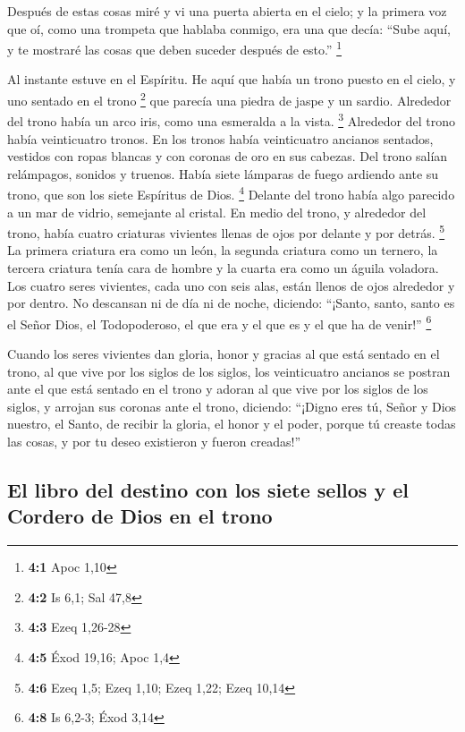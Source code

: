  Después de estas cosas miré y vi una puerta abierta en el
cielo; y la primera voz que oí, como una trompeta que hablaba conmigo,
era una que decía: ``Sube aquí, y te mostraré las cosas que deben
suceder después de esto.'' \footnote{\textbf{4:1} Apoc 1,10}

 Al instante estuve en el Espíritu. He aquí que había un
trono puesto en el cielo, y uno sentado en el trono \footnote{\textbf{4:2}
  Is 6,1; Sal 47,8}  que parecía una piedra de jaspe y un
sardio. Alrededor del trono había un arco iris, como una esmeralda a la
vista. \footnote{\textbf{4:3} Ezeq 1,26-28}  Alrededor del
trono había veinticuatro tronos. En los tronos había veinticuatro
ancianos sentados, vestidos con ropas blancas y con coronas de oro en
sus cabezas.  Del trono salían relámpagos, sonidos y
truenos. Había siete lámparas de fuego ardiendo ante su trono, que son
los siete Espíritus de Dios. \footnote{\textbf{4:5} Éxod 19,16; Apoc 1,4}
 Delante del trono había algo parecido a un mar de vidrio,
semejante al cristal. En medio del trono, y alrededor del trono, había
cuatro criaturas vivientes llenas de ojos por delante y por detrás.
\footnote{\textbf{4:6} Ezeq 1,5; Ezeq 1,10; Ezeq 1,22; Ezeq 10,14}
 La primera criatura era como un león, la segunda criatura
como un ternero, la tercera criatura tenía cara de hombre y la cuarta
era como un águila voladora.  Los cuatro seres vivientes,
cada uno con seis alas, están llenos de ojos alrededor y por dentro. No
descansan ni de día ni de noche, diciendo: ``¡Santo, santo, santo es el
Señor Dios, el Todopoderoso, el que era y el que es y el que ha de
venir!'' \footnote{\textbf{4:8} Is 6,2-3; Éxod 3,14}

 Cuando los seres vivientes dan gloria, honor y gracias al
que está sentado en el trono, al que vive por los siglos de los siglos,
 los veinticuatro ancianos se postran ante el que está
sentado en el trono y adoran al que vive por los siglos de los siglos, y
arrojan sus coronas ante el trono, diciendo:  ``¡Digno
eres tú, Señor y Dios nuestro, el Santo, de recibir la gloria, el honor
y el poder, porque tú creaste todas las cosas, y por tu deseo existieron
y fueron creadas!''

\hypertarget{el-libro-del-destino-con-los-siete-sellos-y-el-cordero-de-dios-en-el-trono}{%
\subsection{El libro del destino con los siete sellos y el Cordero de
Dios en el
trono}\label{el-libro-del-destino-con-los-siete-sellos-y-el-cordero-de-dios-en-el-trono}}

